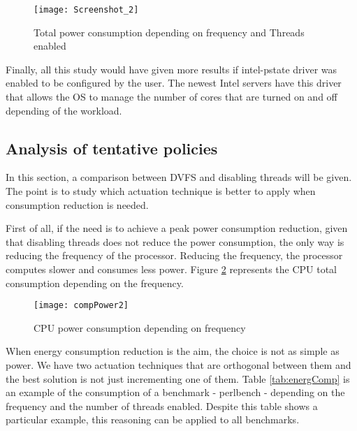 \begin{figure}[H]
\begin{center}
\texttt{[image: Screenshot\_2]} %
\caption{Total power consumption depending on frequency and Threads enabled}
\label{fig:powerProcTotal} %
\end{center}
\end{figure}

Finally, all this study would have given more results if intel-pstate driver was enabled to be configured by the user. The newest Intel servers have this driver that allows the OS to manage the number of cores that are turned on and off depending of the workload.

\subsection{Analysis of tentative policies}

In this section, a comparison between DVFS and disabling threads will be given. The point is to study which actuation technique is better to apply when consumption reduction is needed.

First of all, if the need is to achieve a peak power consumption reduction, given that disabling threads does not reduce the power consumption, the only way is reducing the frequency of the processor. Reducing the frequency, the processor computes slower and consumes less power. Figure \ref{fig:compPower} represents the CPU total consumption depending on the frequency.

\begin{figure}[H]
\begin{center}
\texttt{[image: compPower2]} %
\caption{CPU power consumption depending on frequency}
\label{fig:compPower} %
\end{center}
\end{figure}


When energy consumption reduction is the aim, the choice is not as simple as power. We have two actuation techniques that are orthogonal between them and the best solution is not just incrementing one of them. Table \ref{tab:energComp} is an example of the consumption of a benchmark - perlbench - depending on the frequency and the number of threads enabled. Despite this table shows a particular example, this reasoning can be applied to all benchmarks.

